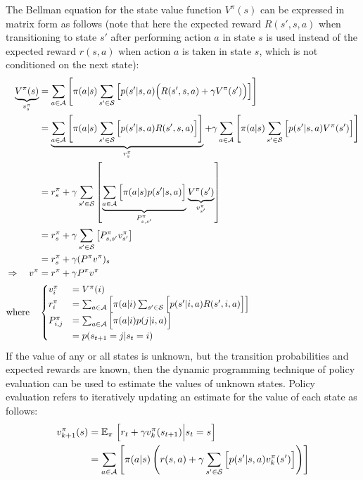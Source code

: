 The Bellman equation for the state value function $V^\pi(s)$ can be expressed in matrix form as follows (note that here the expected reward $R(s',s,a)$ when transitioning to state $s'$ after performing action $a$ in state $s$ is used instead of the expected reward $r(s, a)$ when action $a$ is taken in state $s$, which is not conditioned on the next state):
\begin{align*}
    \underbrace{V^\pi(s)}_{v^\pi_s} &= \sum_{a\in\mathcal{A}}{\left[ \pi(a\vert s) \sum_{s'\in\mathcal{S}}{\left[ p(s'\vert s, a) \Bigl( R(s', s, a) + \gamma V^\pi(s') \Bigr) \right]} \right]} \\
    &= \underbrace{\sum_{a\in\mathcal{A}}{\left[ \pi(a\vert s) \sum_{s'\in\mathcal{S}}{\Bigl[ p(s'\vert s, a) R(s', s, a) \Bigr]} \right]}}_{r^\pi_s} + \gamma\sum_{a\in\mathcal{A}}{\left[ \pi(a\vert s) \sum_{s'\in\mathcal{S}}{\Bigl[ p(s'\vert s, a) V^\pi(s') \Bigr]} \right]} \\
    &= r^\pi_s + \gamma\sum_{s'\in\mathcal{S}}{\left[ \underbrace{\sum_{a\in\mathcal{A}}{\Bigl[ \pi(a\vert s) p(s'\vert s, a) \Bigr]}}_{P^\pi_{s, s'}} \underbrace{V^\pi(s')}_{v^\pi_{s'}} \right]} \\
    &= r^\pi_s + \gamma\sum_{s'\in\mathcal{S}}{\left[ P^\pi_{s, s'} v^\pi_{s'} \right]} \\
    &= r^\pi_s + \gamma  (P^\pi v^\pi)_s \\
    \Rightarrow \quad v^\pi &= r^\pi + \gamma P^\pi v^\pi \\
    \text{where} \quad & \begin{cases}
        v^\pi_i &= V^\pi(i) \\
        r^\pi_i &= \sum_{a\in\mathcal{A}}{\left[ \pi(a\vert i) \sum_{s'\in\mathcal{S}}{\Bigl[ p(s'\vert i, a) R(s', i, a) \Bigr]} \right]} \\
        P^\pi_{i, j} &= \sum_{a\in\mathcal{A}}{\Bigl[ \pi(a\vert i) p(j\vert i, a) \Bigr]} \\
        &= p(s_{t+1}=j\vert s_t=i)
    \end{cases}
\end{align*}
If the value of any or all states is unknown, but the transition probabilities and expected rewards are known, then the dynamic programming technique of policy evaluation can be used to estimate the values of unknown states. Policy evaluation refers to iteratively updating an estimate for the value of each state as follows:
\begin{align*}
    v_{k+1}^\pi(s) &= \mathbb{E}_\pi\left.\Bigl[ r_t + \gamma v_k^\pi(s_{t+1}) \middle\vert s_t=s \Bigr]\right. \\
    &= \sum_{a\in\mathcal{A}}{\left[ \pi(a\vert s) \left( r(s, a) + \gamma\sum_{s'\in\mathcal{S}}{\Bigl[ p(s'\vert s, a) v_k^\pi(s') \Bigr]} \right) \right]}
\end{align*}
